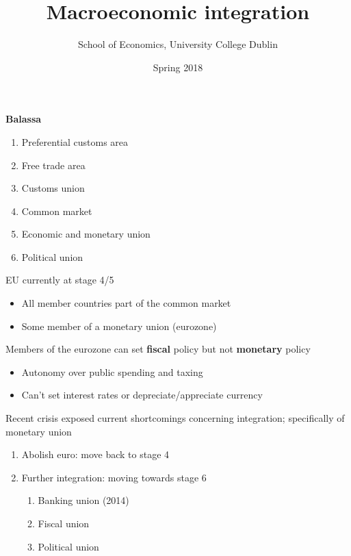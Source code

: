 \documentclass{beamer}
\title{Macroeconomic integration}
\author{School of Economics, University College Dublin}
\date{Spring 2018}
\begin{document}
\begin{frame}
 \titlepage
\end{frame}

\begin{frame}
  \textbf{Balassa}
  \begin{enumerate}
    \item Preferential customs area
    \item Free trade area
    \item Customs union
    \item Common market
    \item Economic and monetary union
    \item Political union
  \end{enumerate}
\end{frame}

\begin{frame}
  EU currently at stage 4/5
  \begin{itemize}
    \item All member countries part of the common market
    \item Some member of a monetary union (eurozone)
  \end{itemize}
  \medskip
  Members of the eurozone can set \textbf{fiscal} policy but not \textbf{monetary} policy
  \begin{itemize}
    \item Autonomy over public spending and taxing
    \item Can't set interest rates or depreciate/appreciate currency
  \end{itemize}
\end{frame}

\begin{frame}
  Recent crisis exposed current shortcomings concerning integration; specifically of monetary union
  \begin{enumerate}
    \item Abolish euro: move back to stage 4
    \item Further integration: moving towards stage 6
    \begin{enumerate}[i]
      \item Banking union (2014)
      \item Fiscal union
      \item Political union
    \end{enumerate}    
  \end{enumerate}  
\end{frame}
\end{document}
